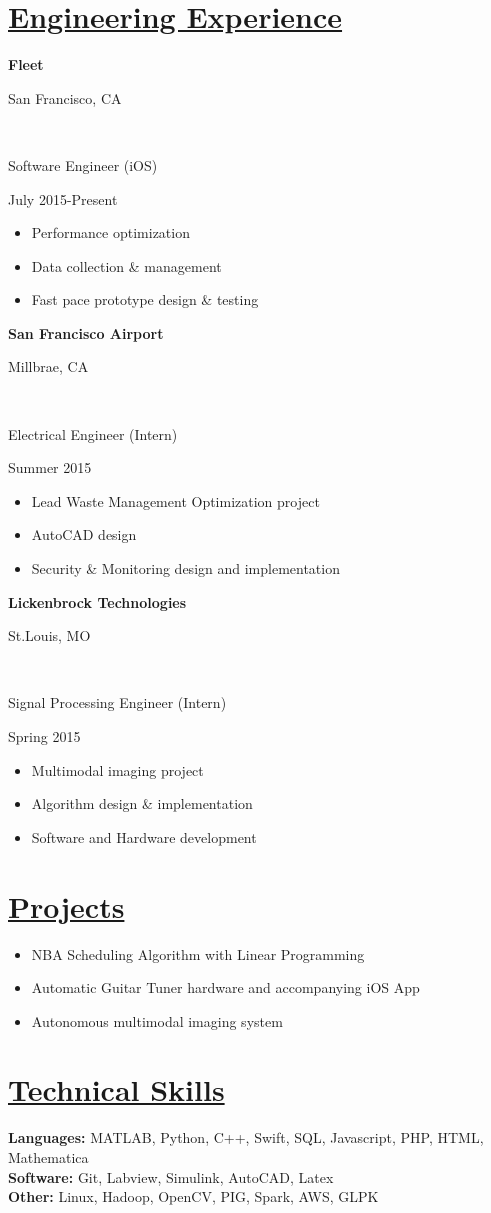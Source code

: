 \documentclass[12pt]{article}
\newcommand\textboxtwo[1]{%
  \parbox{.5\textwidth}{#1}%
}
\newcommand{\lreven}[2]{
	\textboxtwo{#1\hfill}\textboxtwo{\hfill #2}
}
\begin{document}
\section*{\underline{Engineering Experience}}
\lreven{\textbf{Fleet}}{San Francisco, CA}\\
\lreven{\quad Software Engineer (iOS)}{July 2015-Present}
\begin{itemize}[topsep=0pt,itemsep=-1ex,partopsep=1ex,parsep=1ex]
	\item Performance optimization
	\item Data collection \& management 
	\item Fast pace prototype design \& testing
\end{itemize} \vspace{2mm}
\lreven{\textbf{San Francisco Airport}}{ Millbrae, CA }\\
\lreven{\quad Electrical Engineer (Intern)}{Summer 2015}
\begin{itemize}[topsep=0pt,itemsep=-1ex,partopsep=1ex,parsep=1ex]
	\item Lead Waste Management Optimization project
	\item AutoCAD design
	\item Security \& Monitoring design and implementation
\end{itemize}\vspace{2mm}
\lreven{\textbf{Lickenbrock Technologies}}{St.Louis, MO}\\
\lreven{\quad Signal Processing Engineer (Intern)}{Spring 2015}
\begin{itemize}[topsep=0pt,itemsep=-1ex,partopsep=1ex,parsep=1ex]
	\item Multimodal imaging project
	\item Algorithm design \& implementation
	\item Software and Hardware development
\end{itemize}
\section*{\underline{Projects}}
\begin{itemize}[topsep=0pt,itemsep=-.5ex,partopsep=1ex,parsep=1ex]
	\item NBA Scheduling Algorithm with Linear Programming
	\item Automatic Guitar Tuner hardware and accompanying iOS App
	\item Autonomous multimodal imaging system
\end{itemize}

\section*{\underline{Technical Skills}}
\textbf{Languages:} MATLAB, Python, C++, Swift, SQL, Javascript, PHP, HTML, Mathematica \\
\textbf{Software:}  Git, Labview, Simulink, AutoCAD, Latex\\
\textbf{Other:} Linux, Hadoop, OpenCV, PIG, Spark, AWS, GLPK\\
\end{document}
